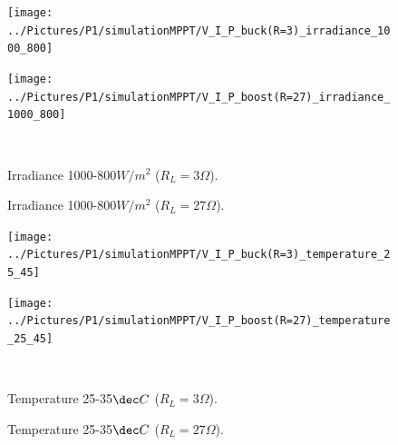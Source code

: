 \begin{figure}[H]
	\begin{minipage}[c]{0.6\textwidth}
		\centering
		\texttt{[image: ../Pictures/P1/simulationMPPT/V\_I\_P\_buck(R=3)\_irradiance\_1000\_800]} %
	\end{minipage}%
	\hfill
	\begin{minipage}[c]{0.6\textwidth}
		\centering
		\texttt{[image: ../Pictures/P1/simulationMPPT/V\_I\_P\_boost(R=27)\_irradiance\_1000\_800]} %
	\end{minipage} \\ %
	\begin{minipage}[t]{0.6\textwidth}
		\caption{Irradiance 1000-800$W/ m^2$ ($R_{L}=3\Omega$).} %
		\label{buckirradiance}
	\end{minipage}%
	\hfill
	\begin{minipage}[t]{0.6\textwidth}
		\caption{Irradiance 1000-800$W/ m^2$ ($R_{L}=27\Omega$).} %
		\label{boostirradiance}
	\end{minipage}
\end{figure}

\vspace{1cm}
\begin{figure}[H]
	\begin{minipage}[c]{0.6\textwidth}
		\centering
		\texttt{[image: ../Pictures/P1/simulationMPPT/V\_I\_P\_buck(R=3)\_temperature\_25\_45]} %
	\end{minipage}%
	\hfill
	\begin{minipage}[c]{0.6\textwidth}
		\centering
		\texttt{[image: ../Pictures/P1/simulationMPPT/V\_I\_P\_boost(R=27)\_temperature\_25\_45]} %
	\end{minipage} \\ %
	\begin{minipage}[t]{0.6\textwidth}
		\caption{Temperature 25-35$\dec C$ ($R_{L}=3\Omega$).} %
		\label{bucktemperature}
	\end{minipage}%
	\hfill
	\begin{minipage}[t]{0.6\textwidth}
		\caption{Temperature 25-35$\dec C$ ($R_{L}=27\Omega$).} %
		\label{boosttemperature}
	\end{minipage}
\end{figure}

